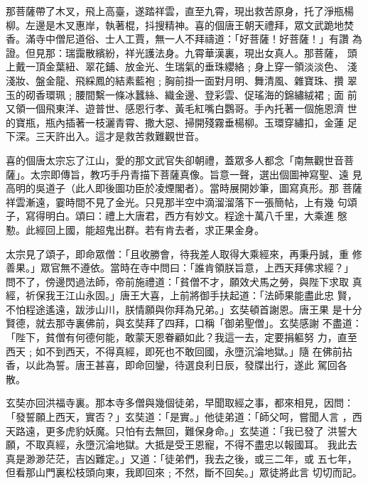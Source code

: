 \begin{pinyinscope}
{那菩薩帶了木叉，飛上高臺，遂踏祥雲，直至九霄，現出救苦原身，托了淨瓶楊
柳。左邊是木叉惠岸，執著棍，抖搜精神。喜的個唐王朝天禮拜，眾文武跪地焚
香。滿寺中僧尼道俗、士人工賈，無一人不拜禱道：「好菩薩！好菩薩！」有讚
為證。但見那：瑞靄散繽紛，祥光護法身。九霄華漢裏，現出女真人。那菩薩，
頭上戴一頂金葉紐、翠花鋪、放金光、生瑞氣的垂珠纓絡﹔身上穿一領淡淡色、
淺淺妝、盤金龍、飛綵鳳的結素藍袍﹔胸前掛一面對月明、舞清風、雜寶珠、攢
翠玉的砌香環珮﹔腰間繫一條冰蠶絲、織金邊、登彩雲、促瑤海的錦繡絨裙﹔面
前又領一個飛東洋、遊普世、感恩行孝、黃毛紅嘴白鸚哥。手內托著一個施恩濟
世的寶瓶，瓶內插著一枝灑青霄、撒大惡、掃開殘霧垂楊柳。玉環穿繡扣，金蓮
足下深。三天許出入。這才是救苦救難觀世音。

喜的個唐太宗忘了江山，愛的那文武官失卻朝禮，蓋眾多人都念「南無觀世音菩
薩」。太宗即傳旨，教巧手丹青描下菩薩真像。旨意一聲，選出個圖神寫聖、遠
見高明的吳道子（此人即後圖功臣於凌煙閣者）。當時展開妙筆，圖寫真形。那
菩薩祥雲漸遠，霎時間不見了金光。只見那半空中滴溜溜落下一張簡帖，上有幾
句頌子，寫得明白。頌曰：禮上大唐君，西方有妙文。程途十萬八千里，大乘進
慇懃。此經回上國，能超鬼出群。若有肯去者，求正果金身。

太宗見了頌子，即命眾僧：「且收勝會，待我差人取得大乘經來，再秉丹誠，重
修善果。」眾官無不遵依。當時在寺中問曰：「誰肯領朕旨意，上西天拜佛求經？」
問不了，傍邊閃過法師，帝前施禮道：「貧僧不才，願效犬馬之勞，與陛下求取
真經，祈保我王江山永固。」唐王大喜，上前將御手扶起道：「法師果能盡此忠
賢，不怕程途遙遠，跋涉山川，朕情願與你拜為兄弟。」玄奘頓首謝恩。唐王果
是十分賢德，就去那寺裏佛前，與玄奘拜了四拜，口稱「御弟聖僧」。玄奘感謝
不盡道：「陛下，貧僧有何德何能，敢蒙天恩眷顧如此？我這一去，定要捐軀努
力，直至西天﹔如不到西天，不得真經，即死也不敢回國，永墮沉淪地獄。」隨
在佛前拈香，以此為誓。唐王甚喜，即命回鑾，待選良利日辰，發牒出行，遂此
駕回各散。

玄奘亦回洪福寺裏。那本寺多僧與幾個徒弟，早聞取經之事，都來相見，因問：
「發誓願上西天，實否？」玄奘道：「是實。」他徒弟道：「師父呵，嘗聞人言
，西天路遠，更多虎豹妖魔。只怕有去無回，難保身命。」玄奘道：「我已發了
洪誓大願，不取真經，永墮沉淪地獄。大抵是受王恩寵，不得不盡忠以報國耳。
我此去真是渺渺茫茫，吉凶難定。」又道：「徒弟們，我去之後，或三二年，或
五七年，但看那山門裏松枝頭向東，我即回來﹔不然，斷不回矣。」眾徒將此言
切切而記。

}
\end{pinyinscope}
